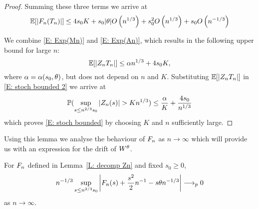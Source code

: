 \begin{proof}
	Summing these three terms we arrive at
	\begin{equation} \label{E: Exp(An)}
	\mathbb{E}[|F_n(T_n)|] \leq 4 s_0 K + s_0|\theta|O\left(n^{1 / 3}\right) + s_0^2O\left(n^{1 / 3}\right) + s_0O\left(n^{-1 / 3}\right)
	\end{equation}
	
	We combine \eqref{E: Exp(Mn)} and \eqref{E: Exp(An)}, 
	which results in the following upper bound for large $n$:
	\begin{equation} \label{E: bound Zn}
	\mathbb{E}[|Z_n{T_n}|] \leq \alpha n^{1 / 3} + 4s_0K,
	\end{equation}
	where $\alpha = \alpha(s_0,\theta)$, but does not depend on $n$ and $K$. 
	Substituting $\mathbb{E}[|Z_n{T_n}|]$ in \eqref{E: stoch bounded 2} we arrive at
	\begin{equation}
	\mathbb{P}( \sup_{s\leq n^{2/3} s_0} |Z_n(s)| > K n^{1 / 3} ) \leq \frac{\alpha}{K} + \frac{4s_0}{n^{1 / 3}}
	\end{equation}
	which proves \eqref{E: stoch bounded} by choosing $K$ and $n$ sufficiently large.
\end{proof}


Using this lemma we analyse the behaviour of $F_n$ as $n \rightarrow \infty$
which will provide us with an expression for the drift of $W^{\theta}$.


\begin{lemma} \label{L: limit An}
	For $F_n$ defined in Lemma~\ref{L: decomp Zn} and fixed $s_0 \geq 0$,
	\begin{equation} \label{E: limit An}
	n^{-1 / 3} \sup_{s \leq n^{2 / 3} s_0 } \left| F_n(s) + \frac{s^2}{2}n^{-1} - s\theta n^{-1 / 3} \right| \longrightarrow_p 0
	\end{equation}
	as $n \rightarrow \infty$.
\end{lemma}

